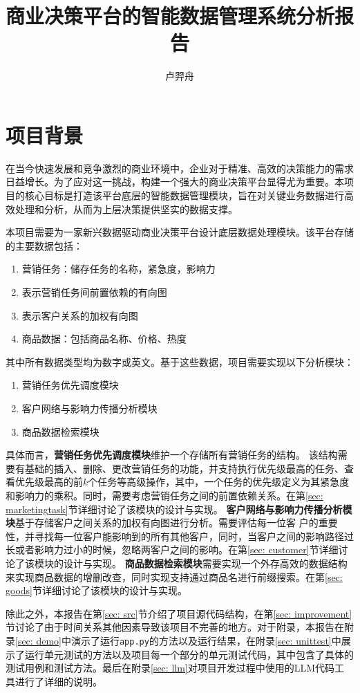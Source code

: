 \documentclass[cn,hazy,blue,10pt,normal]{elegantnote}
\title{商业决策平台的智能数据管理系统分析报告}
\author{卢羿舟}
\institute{统计与数据科学系}
\begin{document}
\maketitle
\tableofcontents


\newpage
\setcounter{page}{1}

\section{项目背景}
在当今快速发展和竞争激烈的商业环境中，企业对于精准、高效的决策能力的需求日益增长。为了应对这一挑战，构建一个强大的商业决策平台显得尤为重要。本项目的核心目标是打造该平台底层的智能数据管理模块，旨在对关键业务数据进行高效处理和分析，从而为上层决策提供坚实的数据支撑。

本项目需要为一家新兴数据驱动商业决策平台设计底层数据处理模块。该平台存储的主要数据包括：
\begin{enumerate}
    \item 营销任务：储存任务的名称，紧急度，影响力
    \item 表示营销任务间前置依赖的有向图
    \item 表示客户关系的加权有向图
    \item 商品数据：包括商品名称、价格、热度
\end{enumerate}
其中所有数据类型均为数字或英文。基于这些数据，项目需要实现以下分析模块：
\begin{enumerate}
    \item 营销任务优先调度模块
    \item 客户网络与影响力传播分析模块
    \item 商品数据检索模块
\end{enumerate}
具体而言，\textbf{营销任务优先调度模块}维护一个存储所有营销任务的结构。
该结构需要有基础的插入、删除、更改营销任务的功能，并支持执行优先级最高的任务、查看优先级最高的前$k$个任务等高级操作，其中，一个任务的优先级定义为其紧急度和影响力的乘积。同时，需要考虑营销任务之间的前置依赖关系。在第\ref{sec: marketingtask}节详细讨论了该模块的设计与实现。
\textbf{客户网络与影响力传播分析模块}基于存储客户之间关系的加权有向图进行分析。需要评估每一位客
户的重要性，并寻找每一位客户能影响到的所有其他客户，同时，当客户之间的影响路径过长或者影响力过小的时候，忽略两客户之间的影响。在第\ref{sec: customer}节详细讨论了该模块的设计与实现。
\textbf{商品数据检索模块}需要实现一个外存高效的数据结构来实现商品数据的增删改查，同时实现支持通过商品名进行前缀搜索。在第\ref{sec: goods}节详细讨论了该模块的设计与实现。

除此之外，本报告在第\ref{sec: src}节介绍了项目源代码结构，在第\ref{sec: improvement}节讨论了由于时间关系其他因素导致该项目不完善的地方。对于附录，本报告在附录\ref{sec: demo}中演示了运行\texttt{app.py}的方法以及运行结果，在附录\ref{sec: unittest}中展示了运行单元测试的方法以及项目每一个部分的单元测试代码，其中包含了具体的测试用例和测试方法。最后在附录\ref{sec: llm}对项目开发过程中使用的LLM代码工具进行了详细的说明。
\end{document}
